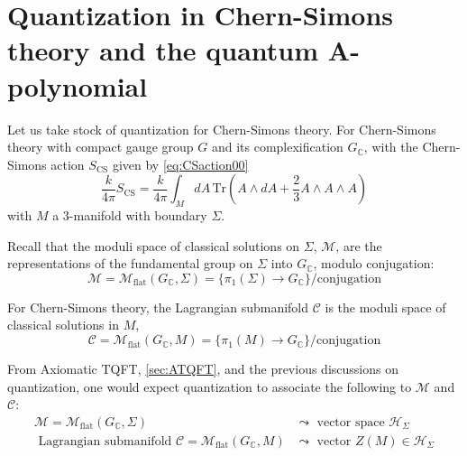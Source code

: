 \documentclass[a4paper,titlepage,twoside]{book}
\begin{document}
\section{Quantization in Chern-Simons theory and the quantum A-polynomial}

Let us take stock of quantization for Chern-Simons theory.  For Chern-Simons theory with compact gauge group $G$ and its complexification $G_{\mathbb{C}}$, with the Chern-Simons action $S_{\text{CS}}$ given by \eqref{eq:CSaction00}
\begin{equation}
\frac{k}{4\pi} S_{\text{CS}} = \frac{k}{4\pi} \int_M dA \, \text{Tr}{ \left( A \wedge dA + \frac{2}{3} A\wedge A \wedge A \right) }  \label{eq:CSaction01}
\end{equation}
with $M$ a 3-manifold with boundary $\Sigma$.  

Recall that the moduli space of classical solutions on $\Sigma$, $\mathcal{M}$, are the representations of the fundamental group on $\Sigma$ into $G_{\mathbb{C}}$, modulo conjugation:
\[
\mathcal{M} = \mathcal{M}_{\text{flat}}{ (G_{\mathbb{C}}, \Sigma)} = \lbrace \pi_1{ (\Sigma)} \to G_{\mathbb{C}} \rbrace /\text{conjugation}
\]

For Chern-Simons theory, the Lagrangian submanifold $\mathcal{C}$ is the moduli space of classical solutions in $M$, 
\[
\mathcal{C} = \mathcal{M}_{\text{flat}}{ (G_{\mathbb{C}}, M)} = \lbrace \pi_1{ (M)} \to G_{\mathbb{C}} \rbrace /\text{conjugation}
\]

From Axiomatic TQFT, \ref{sec:ATQFT}, and the previous discussions on quantization, one would expect quantization to associate the following to $\mathcal{M}$ and $\mathcal{C}$:
\begin{equation}
  \begin{aligned}
    \mathcal{M} = \mathcal{M}_{\text{flat}}{(G_{\mathbb{C}},\Sigma)} & \leadsto \text{ vector space } \mathcal{H}_{\Sigma} \\ 
    \text{ Lagrangian submanifold } \mathcal{C} = \mathcal{M}_{\text{flat}}{ (G_{\mathbb{C}},M)}  & \leadsto \text{ vector } Z(M) \in \mathcal{H}_{\Sigma}
  \end{aligned}
\end{equation}
\end{document}
